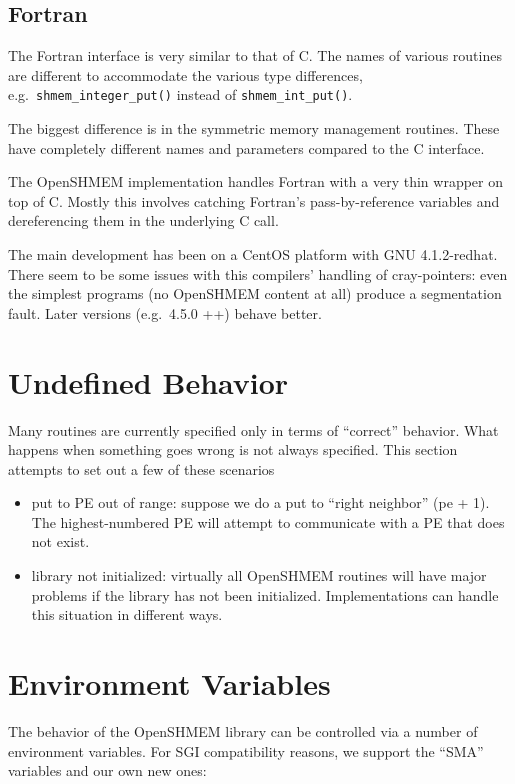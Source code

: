 \documentclass[english]{article}
\begin{document}
\subsection{Fortran}

The Fortran interface is very similar to that of C. The names of
various routines are different to accommodate the various type
differences, e.g.\ \texttt{shmem\_integer\_put()} instead of
\texttt{shmem\_int\_put()}.

The biggest difference is in the symmetric memory management routines.
These have completely different names and parameters compared to the C
interface.

The OpenSHMEM implementation handles Fortran with a very thin wrapper
on top of C. Mostly this involves catching Fortran's pass-by-reference
variables and dereferencing them in the underlying C call.

The main development has been on a CentOS platform with GNU
4.1.2-redhat.  There seem to be some issues with this compilers'
handling of cray-pointers: even the simplest programs (no OpenSHMEM
content at all) produce a segmentation fault. Later versions
(e.g.\ 4.5.0 ++) behave better.

\section{Undefined Behavior}

Many routines are currently specified only in terms of ``correct''
behavior. What happens when something goes wrong is not always
specified.  This section attempts to set out a few of these scenarios
\begin{itemize}
\item put to PE out of range: suppose we do a put to ``right
neighbor'' (pe + 1). The highest-numbered PE will attempt to
communicate with a PE that does not exist.
\item library not initialized: virtually all OpenSHMEM routines will
have major problems if the library has not been
initialized. Implementations can handle this situation in different
ways.
\end{itemize}

\section{Environment Variables\label{sec:Environment-Variables}}

The behavior of the OpenSHMEM library can be controlled via a number
of environment variables. For SGI compatibility reasons, we support
the ``SMA'' variables and our own new ones:
\end{document}
